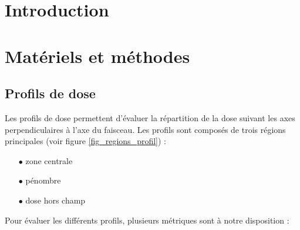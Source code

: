 \documentclass{article}
\begin{document}




\onehalfspacing

\pagestyle{fancy}
	\renewcommand\headrulewidth{0.5pt}
	\renewcommand\footrulewidth{0.5pt}
	\fancyfoot[R]{\thepage}

\tableofcontents
\clearpage
\section{Introduction}

\section{Matériels et méthodes}

\subsection{Profils de dose}

Les profils de dose permettent d'évaluer la répartition de la dose suivant les axes perpendiculaires à l'axe du faisceau. Les profils sont composés de trois régions principales (voir figure \ref*{fig_regions_profil}) :

\begin{itemize}
  \item[$\bullet$] zone centrale
  \item[$\bullet$] pénombre
  \item[$\bullet$] dose hors champ
\end{itemize}

Pour évaluer les différents profils, plusieurs métriques sont à notre disposition :
\end{document}

